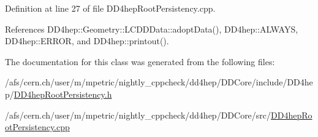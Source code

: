 Definition at line 27 of file DD4hepRootPersistency.cpp.

References DD4hep::Geometry::LCDDData::adoptData(), DD4hep::ALWAYS, DD4hep::ERROR, and DD4hep::printout().

The documentation for this class was generated from the following files:\begin{DoxyCompactItemize}
\item 
/afs/cern.ch/user/m/mpetric/nightly\_\-cppcheck/dd4hep/DDCore/include/DD4hep/\hyperlink{_d_d4hep_root_persistency_8h}{DD4hepRootPersistency.h}\item 
/afs/cern.ch/user/m/mpetric/nightly\_\-cppcheck/dd4hep/DDCore/src/\hyperlink{_d_d4hep_root_persistency_8cpp}{DD4hepRootPersistency.cpp}\end{DoxyCompactItemize}
